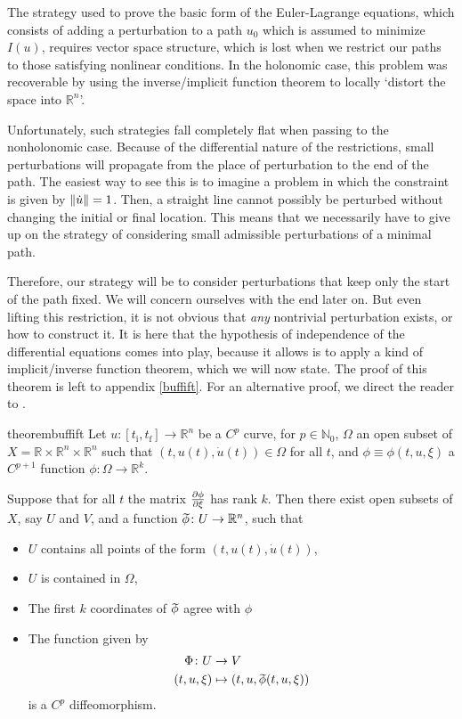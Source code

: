 \documentclass{article}
\theoremstyle{plain}
\theoremstyle{plain}
\theoremstyle{nonumberplain}
\theoremstyle{empty}
\newcommand{\R}{\mathbb{R}}
\newcommand{\N}{\mathbb{N}}
\newcommand{\tstart}{\mathrm{i}}
\newcommand{\tend}{\mathrm{f}}
\newcommand{\wtphi}{
  \mspace{2mu}
  \widetilde{\mspace{-2mu}\smash[t]{\phi}}
}
\DeclarePairedDelimiter\norm{\lVert}{\rVert}
\begin{document}
The strategy used to prove the basic form of the Euler-Lagrange equations, which consists of adding a perturbation to a path $u_0$ which is assumed to minimize $I(u)$, requires vector space structure, which is lost when we restrict our paths to those satisfying nonlinear conditions. In the holonomic case, this problem was recoverable by using the inverse/implicit function theorem to locally `distort the space into $\R^n$'.

Unfortunately, such strategies fall completely flat when passing to the nonholonomic case. Because of the differential nature of the restrictions, small perturbations will propagate from the place of perturbation to the end of the path. The easiest way to see this is to imagine a problem in which the constraint is given by $\norm{\dot u} = 1$. Then, a straight line cannot possibly be perturbed without changing the initial or final location. This means that we necessarily have to give up on the strategy of considering small admissible perturbations of a minimal path.

Therefore, our strategy will be to consider perturbations that keep only the start of the path fixed. We will concern ourselves with the end later on. But even lifting this restriction, it is not obvious that \emph{any} nontrivial perturbation exists, or how to construct it. It is here that the hypothesis of independence of the differential equations comes into play, because it allows is to apply a kind of implicit/inverse function theorem, which we will now state. The proof of this theorem is left to appendix \ref{buffift}. For an alternative proof, we direct the reader to \cite[\S 3]{blissmayer}.

\begin{restatable}{theorem}{buffift}\label{thm:buffift}
Let $u \colon [t_\tstart,t_\tend] \to \R^n$ be a $C^p$ curve, for $p \in \N_0$, $\Omega$ an open subset of $X = \R \times \R^n \times \R^n$ such that $(t,u(t),\dot u(t)) \in \Omega$ for all $t$, and $\phi \equiv \phi(t,u,\xi)$ a $C^{p+1}$ function $\phi \colon \Omega \to \R^k$.

Suppose that for all $t$ the matrix $\diffp\phi\xi$ has rank $k$. Then there exist open subsets of $X$, say $U$ and $V$, and a function $\wtphi \colon U \to \R^n$, such that
\begin{itemize}
\item $U$ contains all points of the form $(t,u(t),\dot u(t))$,
\item $U$ is contained in $\Omega$,
\item The first $k$ coordinates of $\wtphi$ agree with $\phi$
\item The function given by
\begin{align*}
\Phi \colon U &\to V\\
(t,u,\xi) &\mapsto (t,u,\wtphi(t,u,\xi))
\end{align*}
is a $C^p$ diffeomorphism.
\end{itemize}
\end{restatable}
\end{document}
